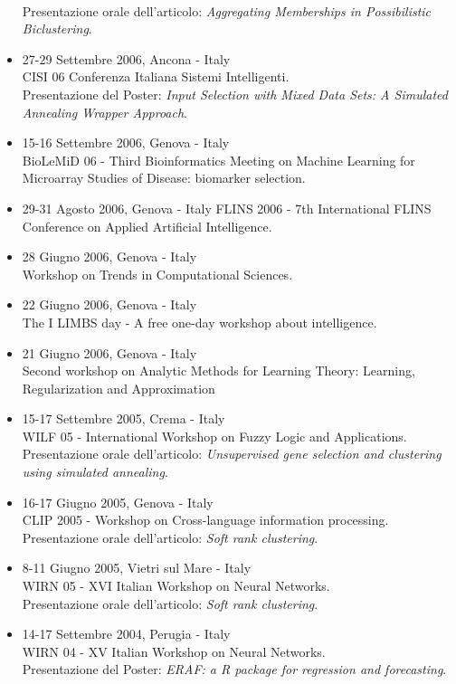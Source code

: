 \documentclass[a4paper,10pt]{article}
\begin{document}
\begin{itemize}
  \\Presentazione orale dell'articolo: \emph{Aggregating Memberships in Possibilistic Biclustering}.
\item 27-29 Settembre 2006, Ancona - Italy \\
  CISI 06 Conferenza Italiana Sistemi Intelligenti.
  \\Presentazione del Poster: \emph{Input Selection with Mixed Data Sets: A Simulated Annealing Wrapper Approach}.
\item 15-16 Settembre 2006, Genova - Italy \\
  BioLeMiD 06 - Third Bioinformatics Meeting on Machine Learning for Microarray Studies of Disease: biomarker selection.
\item 29-31 Agosto 2006, Genova - Italy
  FLINS 2006 - 7th International FLINS Conference on Applied Artificial Intelligence.
\item 28 Giugno 2006, Genova - Italy \\
  Workshop on Trends in Computational Sciences.
\item 22 Giugno 2006, Genova - Italy \\
  The I LIMBS day - A free one-day workshop about intelligence.
\item 21 Giugno 2006, Genova - Italy \\
  Second workshop on Analytic Methods for Learning Theory: Learning, Regularization and Approximation
\item 15-17 Settembre 2005, Crema - Italy \\
  WILF 05 - International Workshop on Fuzzy Logic and Applications.
  \\Presentazione orale dell'articolo: \emph{Unsupervised gene selection and clustering using simulated annealing}.
\item 16-17 Giugno 2005, Genova - Italy \\
  CLIP 2005 - Workshop on Cross-language information processing.
  \\Presentazione orale dell'articolo: \emph{Soft rank clustering}.
\item 8-11 Giugno 2005, Vietri sul Mare - Italy \\
  WIRN 05 - XVI Italian Workshop on Neural Networks.
  \\Presentazione orale dell'articolo: \emph{Soft rank clustering}.
\item 14-17 Settembre 2004, Perugia - Italy \\
  WIRN 04 - XV Italian Workshop on Neural Networks.
  \\Presentazione del Poster: \emph{ERAF: a R package for regression and forecasting}.
\end{itemize}
\end{document}
